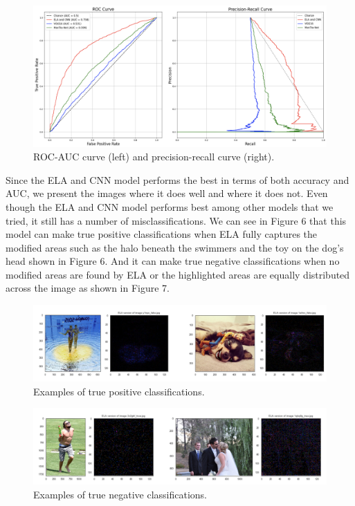 \documentclass[11pt]{article}
\begin{document}
\begin{figure}[!htb]
    \centering
        \includegraphics[scale=.31]{figures/figure_7.png}
    \caption{ROC-AUC curve (left) and precision-recall curve (right).}
    \label{fig:5}
\end{figure}

Since the ELA and CNN model performs the best in terms of both accuracy and AUC, we present the images where it does well and where it does not. Even though the ELA and CNN model performs best among other models that we tried, it still has a number of misclassifications. We can see in Figure 6 that this model can make true positive classifications when ELA fully captures the modified areas such as the halo beneath the swimmers and the toy on the dog’s head shown in Figure 6. And it can make true negative classifications when no modified areas are found by ELA or the highlighted areas are equally distributed across the image as shown in Figure 7.

\begin{figure}[!htb]
    \centering
        \includegraphics[scale=.42]{figures/figure_8.png}
    \caption{Examples of true positive classifications.}
    \label{fig:6}
\end{figure}

\begin{figure}[!htb]
    \centering
        \includegraphics[scale=.42]{figures/figure_9.png}
    \caption{Examples of true negative classifications.}
    \label{fig:7}
\end{figure}
\end{document}
